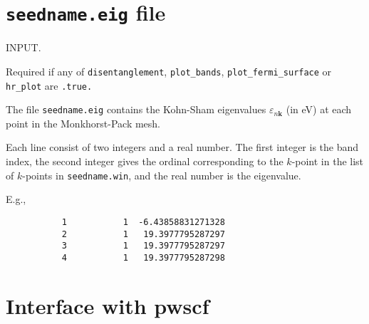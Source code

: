 %


\section{{\tt seedname.eig} file}

INPUT. 

Required if any of \verb#disentanglement#, \verb#plot_bands#,
   \verb#plot_fermi_surface# or \verb#hr_plot# are \verb#.true.#

The file \verb#seedname.eig# contains the Kohn-Sham eigenvalues
     $\varepsilon_{n\mathbf{k}}$ (in eV) at each point in the
     Monkhorst-Pack mesh.

Each line consist of two integers and a real number. The first integer
is the band index, the second integer gives the ordinal corresponding
to the $k$-point in the list of $k$-points in \verb#seedname.win#,
and the real number is the eigenvalue. 

E.g.,

\begin{verbatim}
           1           1  -6.43858831271328
           2           1   19.3977795287297
           3           1   19.3977795287297
           4           1   19.3977795287298
\end{verbatim}


\section{Interface with {\sc pwscf}}

